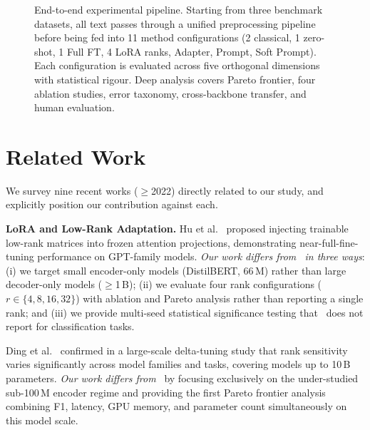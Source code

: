 \documentclass[conference]{IEEEtran}
\begin{document}
\begin{figure}[!t]
\caption{End-to-end experimental pipeline. Starting from three benchmark datasets, all text passes through a unified preprocessing pipeline before being fed into 11 method configurations (2 classical, 1 zero-shot, 1 Full FT, 4 LoRA ranks, Adapter, Prompt, Soft Prompt). Each configuration is evaluated across five orthogonal dimensions with statistical rigour. Deep analysis covers Pareto frontier, four ablation studies, error taxonomy, cross-backbone transfer, and human evaluation.}
\label{fig:pipeline}
\end{figure}

\section{Related Work}
\label{sec:related}

We survey nine recent works (${\geq}$2022) directly related to our study, and explicitly position our contribution against each.

\textbf{LoRA and Low-Rank Adaptation.}
Hu et al.~\cite{hu2022lora} proposed injecting trainable low-rank matrices into frozen attention projections, demonstrating near-full-fine-tuning performance on GPT-family models. \textit{Our work differs from~\cite{hu2022lora} in three ways}: (i) we target small encoder-only models (DistilBERT, 66\,M) rather than large decoder-only models (${\geq}$1\,B); (ii) we evaluate four rank configurations ($r{\in}\{4,8,16,32\}$) with ablation and Pareto analysis rather than reporting a single rank; and (iii) we provide multi-seed statistical significance testing that~\cite{hu2022lora} does not report for classification tasks.

Ding et al.~\cite{ding2023delta} confirmed in a large-scale delta-tuning study that rank sensitivity varies significantly across model families and tasks, covering models up to 10\,B parameters. \textit{Our work differs from~\cite{ding2023delta}} by focusing exclusively on the under-studied sub-100\,M encoder regime and providing the first Pareto frontier analysis combining F1, latency, GPU memory, and parameter count simultaneously on this model scale.
\end{document}
